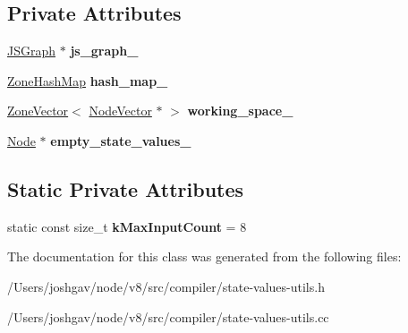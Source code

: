 \subsection*{Private Attributes}
\begin{DoxyCompactItemize}
\item 
\hyperlink{classv8_1_1internal_1_1compiler_1_1_j_s_graph}{J\+S\+Graph} $\ast$ {\bfseries js\+\_\+graph\+\_\+}\hypertarget{classv8_1_1internal_1_1compiler_1_1_state_values_cache_a0424819e36b65e89ad88bfbb622e12f4}{}\label{classv8_1_1internal_1_1compiler_1_1_state_values_cache_a0424819e36b65e89ad88bfbb622e12f4}

\item 
\hyperlink{classv8_1_1internal_1_1_template_hash_map_impl}{Zone\+Hash\+Map} {\bfseries hash\+\_\+map\+\_\+}\hypertarget{classv8_1_1internal_1_1compiler_1_1_state_values_cache_abe4eac42b51c2c599db0f18b82b5bd1a}{}\label{classv8_1_1internal_1_1compiler_1_1_state_values_cache_abe4eac42b51c2c599db0f18b82b5bd1a}

\item 
\hyperlink{classv8_1_1internal_1_1_zone_vector}{Zone\+Vector}$<$ \hyperlink{classv8_1_1internal_1_1_zone_vector}{Node\+Vector} $\ast$ $>$ {\bfseries working\+\_\+space\+\_\+}\hypertarget{classv8_1_1internal_1_1compiler_1_1_state_values_cache_a4b91c15a3e011976baa402192a6e6046}{}\label{classv8_1_1internal_1_1compiler_1_1_state_values_cache_a4b91c15a3e011976baa402192a6e6046}

\item 
\hyperlink{classv8_1_1internal_1_1compiler_1_1_node}{Node} $\ast$ {\bfseries empty\+\_\+state\+\_\+values\+\_\+}\hypertarget{classv8_1_1internal_1_1compiler_1_1_state_values_cache_a96656aedf1a8d15896046c7010430359}{}\label{classv8_1_1internal_1_1compiler_1_1_state_values_cache_a96656aedf1a8d15896046c7010430359}

\end{DoxyCompactItemize}
\subsection*{Static Private Attributes}
\begin{DoxyCompactItemize}
\item 
static const size\+\_\+t {\bfseries k\+Max\+Input\+Count} = 8\hypertarget{classv8_1_1internal_1_1compiler_1_1_state_values_cache_a4828a0b045f4c8d4291fd50116a017af}{}\label{classv8_1_1internal_1_1compiler_1_1_state_values_cache_a4828a0b045f4c8d4291fd50116a017af}

\end{DoxyCompactItemize}


The documentation for this class was generated from the following files\+:\begin{DoxyCompactItemize}
\item 
/\+Users/joshgav/node/v8/src/compiler/state-\/values-\/utils.\+h\item 
/\+Users/joshgav/node/v8/src/compiler/state-\/values-\/utils.\+cc\end{DoxyCompactItemize}
